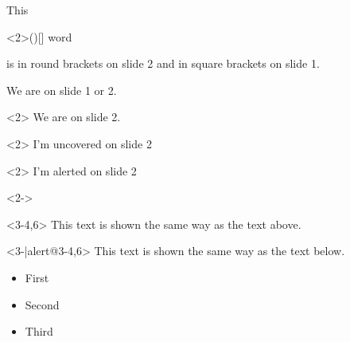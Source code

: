 \documentclass{beamer}
\begin{document}
\begin{frame}
    This
    \begin{altenv}<2>{(}{)}{[}{]}
        word
    \end{altenv}
    is in round brackets on slide 2 and in square brackets on slide 1.
\end{frame}

\begin{frame}
    We are on slide 1 or 2. 
    \begin{onlyenv}<2>
        We are on slide 2.
    \end{onlyenv}
\end{frame}

\begin{frame}
    \begin{uncoverenv}<2>
        I'm uncovered on slide 2
    \end{uncoverenv}
\end{frame}

\begin{frame}
    \begin{alertenv}<2>
        I'm alerted on slide 2
    \end{alertenv}
\end{frame}

\begin{frame}
    \begin{uncoverenv}<2->
        \begin{alertenv}<3-4,6>
            This text is shown the same way as the text above.
        \end{alertenv}
    \end{uncoverenv}
\end{frame}

\begin{frame}
    \begin{actionenv}<3-|alert@3-4,6>
        This text is shown the same way as the text below.
    \end{actionenv}
\end{frame}

\begin{frame}
    \begin{itemize}
        \item First
        \item<2-|alert@3>Second
        \item Third
    \end{itemize}
\end{frame}
\end{document}
